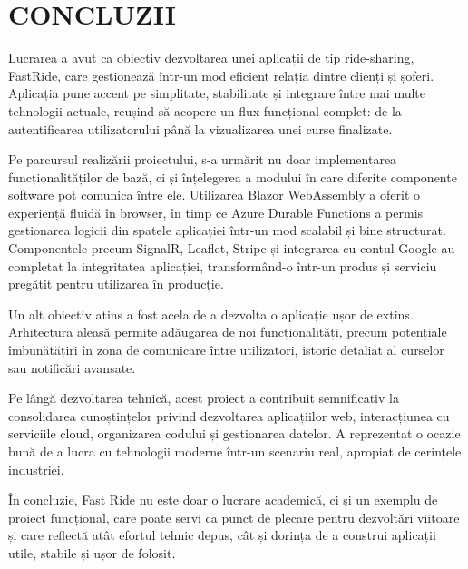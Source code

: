 \chapter{CONCLUZII}
Lucrarea a avut ca obiectiv dezvoltarea unei aplicații de tip ride-sharing, FastRide, care gestionează într-un mod eficient relația dintre clienți și șoferi. Aplicația pune accent pe simplitate, stabilitate și integrare între mai multe tehnologii actuale, reușind să acopere un flux funcțional complet: de la autentificarea utilizatorului până la vizualizarea unei curse finalizate.

Pe parcursul realizării proiectului, s-a urmărit nu doar implementarea funcționalităților de bază, ci și înțelegerea a modului în care diferite componente software pot comunica între ele. Utilizarea Blazor WebAssembly a oferit o experiență fluidă în browser, în timp ce Azure Durable Functions a permis gestionarea logicii din spatele aplicației într-un mod scalabil și bine structurat. Componentele precum SignalR, Leaflet, Stripe și integrarea cu contul Google au completat la integritatea aplicației, transformând-o într-un produs și serviciu pregătit pentru utilizarea în producție.

Un alt obiectiv atins a fost acela de a dezvolta o aplicație ușor de extins. Arhitectura aleasă permite adăugarea de noi funcționalități, precum potențiale îmbunătățiri în zona de comunicare între utilizatori, istoric detaliat al curselor sau notificări avansate.

Pe lângă dezvoltarea tehnică, acest proiect a contribuit semnificativ la consolidarea cunoștințelor privind dezvoltarea aplicațiilor web, interacțiunea cu serviciile cloud, organizarea codului și gestionarea datelor. A reprezentat o ocazie bună de a lucra cu tehnologii moderne într-un scenariu real, apropiat de cerințele industriei.

În concluzie, Fast Ride nu este doar o lucrare academică, ci și un exemplu de proiect funcțional, care poate servi ca punct de plecare pentru dezvoltări viitoare și care reflectă atât efortul tehnic depus, cât și dorința de a construi aplicații utile, stabile și ușor de folosit.